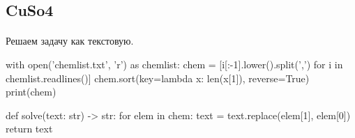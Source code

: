 \documentclass[12pt]{article}
\begin{document}
%
%
%
    \subsection{CuSo4}
    \paragraph{}
    Решаем задачу как текстовую.

    \begin{pythoncode}
with open('chemlist.txt', 'r') as chemlist:
    chem = [i[:-1].lower().split(',') for i in chemlist.readlines()]
chem.sort(key=lambda x: len(x[1]), reverse=True)
print(chem)

def solve(text: str) -> str:
    for elem in chem:
        text = text.replace(elem[1], elem[0])
    return text
    \end{pythoncode}
\end{document}
